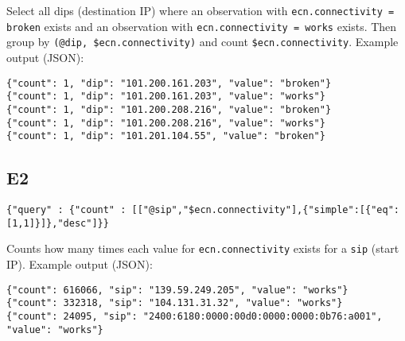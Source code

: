 \documentclass[a4paper]{article}
\begin{document}
Select all dips (destination IP) where an observation with
\verb|ecn.connectivity = broken| exists and an observation with
\verb|ecn.connectivity = works| exists.  Then group by
\verb|(@dip, $ecn.connectivity)| and count
\verb|$ecn.connectivity|. Example output (JSON):

\begin{tiny}
\begin{verbatim}
{"count": 1, "dip": "101.200.161.203", "value": "broken"}
{"count": 1, "dip": "101.200.161.203", "value": "works"}
{"count": 1, "dip": "101.200.208.216", "value": "broken"}
{"count": 1, "dip": "101.200.208.216", "value": "works"}
{"count": 1, "dip": "101.201.104.55", "value": "broken"}
\end{verbatim}
\end{tiny}

\subsection{E2}

\begin{tiny}
\begin{verbatim}
{"query" : {"count" : [["@sip","$ecn.connectivity"],{"simple":[{"eq":[1,1]}]},"desc"]}}
\end{verbatim}
\end{tiny}

Counts how many times each value for \verb|ecn.connectivity| exists
for a \verb|sip| (start IP). Example output (JSON):

\begin{tiny}
\begin{verbatim}
{"count": 616066, "sip": "139.59.249.205", "value": "works"}
{"count": 332318, "sip": "104.131.31.32", "value": "works"}
{"count": 24095, "sip": "2400:6180:0000:00d0:0000:0000:0b76:a001", "value": "works"}
\end{verbatim}
\end{tiny}
\end{document}

